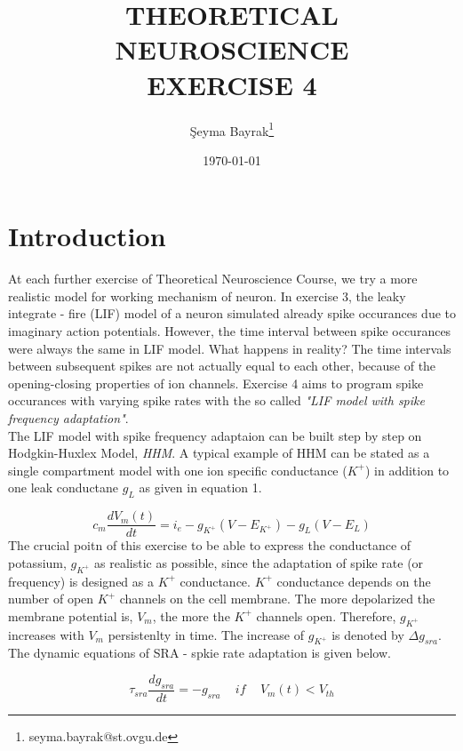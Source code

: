 \documentclass{article}
\begin{document}
\title{THEORETICAL NEUROSCIENCE \\ EXERCISE 4}
\date{\today}
\author[1]{\c{S}eyma Bayrak\thanks{seyma.bayrak@st.ovgu.de}}
\maketitle

\section*{Introduction}

At each further exercise of Theoretical Neuroscience Course, we try a more realistic model for working mechanism of neuron. In exercise 3, the leaky integrate - fire (LIF) model of a neuron simulated already spike occurances due to imaginary action potentials. However, the time interval between spike occurances were always the same in LIF model. What happens in reality? The time intervals between subsequent spikes are not actually equal to each other, because of the opening-closing properties of ion channels. Exercise 4 aims to program spike occurances with varying spike rates with the so called \textit{"LIF model with spike frequency adaptation"}.\\

The LIF model with spike frequency adaptaion can be built step by step on Hodgkin-Huxlex Model, \textit{HHM}. A typical example of HHM can be stated as a single compartment model with one ion specific conductance ($K^{+}$) in addition to one leak conductane $g_{L}$ as given in equation 1.

\begin{equation}
 c_{m}\frac{dV_{m}(t)}{dt}=i_{e}-g_{K^{+}}(V-E_{K^{+}})-g_{L}(V-E_{L})
\end{equation}
The crucial poitn of this exercise to be able to express the conductance of potassium, $g_{K^{+}}$ as realistic as possible, since the adaptation of spike rate (or frequency) is designed as a $K^{+}$ conductance. $K^{+}$ conductance depends on the number of open $K^{+}$ channels on the cell membrane. The more depolarized the membrane potential is, $V_{m}$, the more the $K^{+}$ channels open. Therefore, $g_{K^{+}}$ increases with $V_{m}$ persistenlty in time.  The increase of $g_{K^{+}}$ is denoted by $\Delta g_{sra}$. The dynamic equations of SRA - spkie rate adaptation is given below. 

\begin{equation}
\tau_{sra}\frac{dg_{sra}}{dt}=-g_{sra} \,\,\,\,\,\,\,if\,\,\,\,\,\,\,V_{m}(t)<V_{th}
\end{equation}
\end{document}
